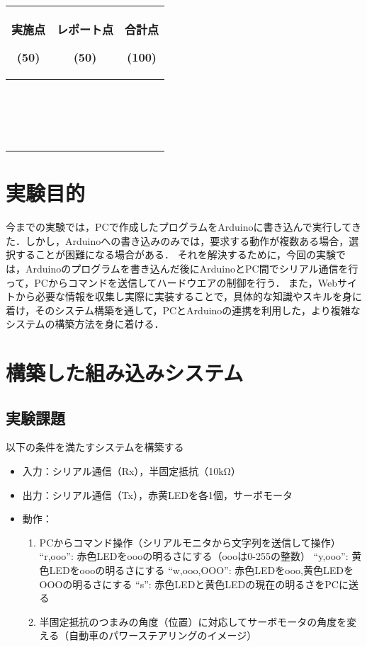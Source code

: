 \documentclass{ltjsarticle}
\begin{document}
\begin{center}
    \begin{tabularx}{100mm}{|C|C|C|} \hline
        実施点\par(50) & レポート点\par(50) & 合計点\par(100) \\ \hline
        \ \par\ \par & & \\ \hline
    \end{tabularx}
\end{center}

\newpage

\section{実験目的}

今までの実験では，PCで作成したプログラムをArduinoに書き込んで実行してきた．しかし，Arduinoへの書き込みのみでは，要求する動作が複数ある場合，選択することが困難になる場合がある．
それを解決するために，今回の実験では，Arduinoのプログラムを書き込んだ後にArduinoとPC間でシリアル通信を行って，PCからコマンドを送信してハードウエアの制御を行う．
また，Webサイトから必要な情報を収集し実際に実装することで，具体的な知識やスキルを身に着け，そのシステム構築を通して，PCとArduinoの連携を利用した，より複雑なシステムの構築方法を身に着ける．


\section{構築した組み込みシステム}
\subsection{実験課題}
以下の条件を満たすシステムを構築する
\begin{itemize}
    \item 入力：シリアル通信（Rx），半固定抵抗（10kΩ）
    \item 出力：シリアル通信（Tx），赤黄LEDを各1個，サーボモータ
    \item 動作：\begin{enumerate}
        \item PCからコマンド操作（シリアルモニタから文字列を送信して操作）
        “r,ooo”: 赤色LEDをoooの明るさにする（oooは0-255の整数）
        “y,ooo”: 黄色LEDをoooの明るさにする
        “w,ooo,OOO”: 赤色LEDをooo,黄色LEDをOOOの明るさにする
        “s”: 赤色LEDと黄色LEDの現在の明るさをPCに送る
        \item 半固定抵抗のつまみの角度（位置）に対応してサーボモータの角度を変える（自動車のパワーステアリングのイメージ）
    \end{enumerate}
\end{itemize}
\end{document}
